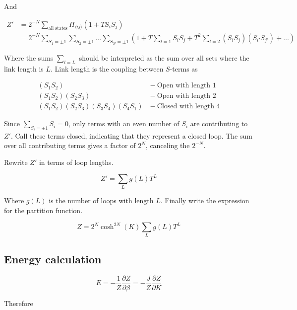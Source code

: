 And

\begin{align*}
    Z' &= 2^{-N} \sum_{\text{all states}} \Pi_{\langle ij \rangle} (1 + T S_i S_j) \\
    &= 2^{-N} \sum_{S_1 = \pm 1} \sum_{S_2 = \pm 1} \ldots \sum_{S_N = \pm 1} \left ( 1 + T \sum_{l = 1} S_i S_j + T^2 \sum_{l = 2} (S_i S_j)(S_{i'} S_{j'}) + \ldots \right ) 
\end{align*}

Where the sums $\sum_{l=L}$ should be interpreted as the sum over all sets where the link length is $L$. Link length is the coupling between $S$-terms as

\begin{align*}
    (S_1 S_2) \ &- \ \text{Open with length 1} \\
    (S_1 S_2)(S_2 S_3) \ &- \ \text{Open with length 2} \\
    (S_1 S_2)(S_2 S_3)(S_3 S_4)(S_4 S_1) \ &- \ \text{Closed with length 4}
\end{align*}


Since $\sum_{S_i = \pm 1} S_i = 0$, only terms with an even number of $S_i$ are contributing to $Z'$. Call these terms closed, indicating that they represent a closed loop. The sum over all contributing terms gives a factor of $2^N$, canceling the $2^{-N}$.

Rewrite $Z'$ in terms of loop lengths.

\begin{equation}
    Z' = \sum_L g(L) T^L
\end{equation}

Where $g(L)$ is the number of loops with length $L$. Finally write the expression for the partition function.

\begin{equation}
    Z = 2^N \cosh^{2N} (K) \sum_L g(L) T^L
\end{equation}

\subsection{Energy calculation}

\begin{equation}
    E = - \frac{1}{Z} \frac{\partial Z}{\partial \beta} = - \frac{J}{Z} \frac{\partial Z}{\partial K}
\end{equation}

Therefore

